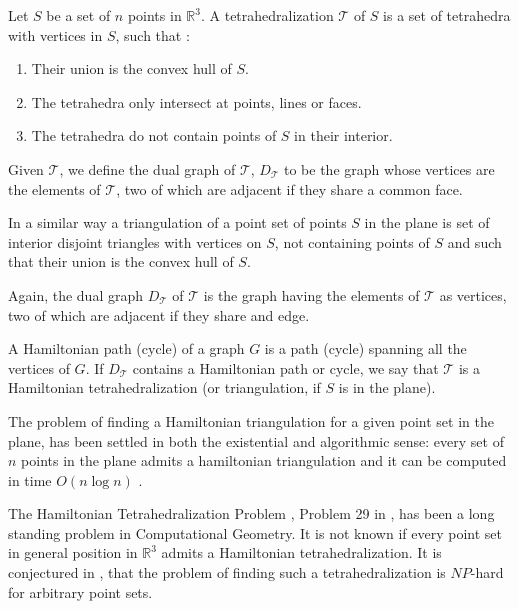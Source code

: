 \documentclass{article}
\begin{document}
Let $S$ be a set of $n$ points in $\mathbb{R}^3$. 
A tetrahedralization $\mathcal{T}$ of $S$ is a set 
of tetrahedra with vertices in $S$, such that :

\begin{enumerate}
\item Their union is the convex hull of $S$.

 \item The tetrahedra only intersect at points, lines
or faces.

    \item The tetrahedra do not contain points of $S$ in
their interior.
\end{enumerate}

Given $\mathcal{T}$, we define the dual
graph of $\mathcal{T}$, $D_\mathcal{T}$ to
be the graph whose vertices are the elements of 
$\mathcal{T}$, two of which are adjacent if they
share a common face.\par

In a similar way a triangulation of a point set of points  $S$ 
in the plane is set of interior 
disjoint triangles
with vertices on $S$, not containing points of $S$
and such that their union is the convex hull of $S$.\par

Again, the dual graph $D_\mathcal{T}$ of $\mathcal{T}$ is the graph having
 the elements of $\mathcal{T}$ as vertices, two of which
are adjacent if they share and edge.\par

A Hamiltonian path (cycle) of a graph $G$ is a path (cycle)
spanning all the vertices of $G$. If $D_\mathcal{T}$ contains
a Hamiltonian path or cycle, we say that $\mathcal{T}$
is a Hamiltonian tetrahedralization (or triangulation, if $S$ is in
the plane).\par

The problem of finding a Hamiltonian triangulation for
a given point set in the plane, has been
settled in both the existential and algorithmic
sense: every set of $n$ points in the plane 
admits a hamiltonian 
triangulation and it can be computed
in time $O(n\log n)$ \cite{skiena, faurr}.

The Hamiltonian Tetrahedralization Problem 
\cite{skiena}, Problem 29 in \cite{open}, 
has been a long standing problem in 
Computational Geometry.
It is not known if every point set in general
position in $\mathbb{R}^3$ admits
a Hamiltonian tetrahedralization.
It is conjectured in \cite{skiena}, that the
problem of finding such a tetrahedralization
is $NP$-hard for arbitrary point sets.\par
\end{document}
